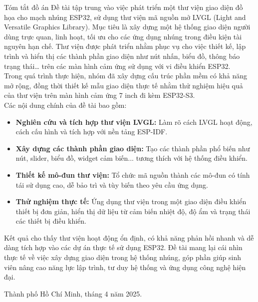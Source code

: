     \begin{preface}{Tóm tắt đồ án}
    \tab Đề tài tập trung vào việc phát triển một thư viện giao diện đồ họa cho mạch nhúng ESP32, sử dụng thư viện mã nguồn mở LVGL (Light and Versatile Graphics Library). Mục tiêu là xây dựng một hệ thống giao diện người dùng trực quan, linh hoạt, tối ưu cho các ứng dụng nhúng trong điều kiện tài nguyên hạn chế. Thư viện được phát triển nhằm phục vụ cho việc thiết kế, lập trình và hiển thị các thành phần giao diện như nút nhấn, biểu đồ, thông báo trạng thái… trên các màn hình cảm ứng sử dụng với vi điều khiển ESP32.\\
    \tab Trong quá trình thực hiện, nhóm đã xây dựng cấu trúc phần mềm có khả năng mở rộng, đồng thời thiết kế mẫu giao diện thực tế nhằm thử nghiệm hiệu quả của thư viện trên màn hình cảm ứng 7 inch đi kèm ESP32-S3.\\
    \tab Các nội dung chính của đề tài bao gồm:
    \begin{itemize}
        \item \textbf{Nghiên cứu và tích hợp thư viện LVGL:} Làm rõ cách LVGL hoạt động, cách cấu hình và tích hợp với nền tảng ESP-IDF.
        \item \textbf{Xây dựng các thành phần giao diện:} Tạo các thành phần phổ biến như nút, slider, biểu đồ, widget cảm biến... tương thích với hệ thống điều khiển.
        \item \textbf{Thiết kế mô-đun thư viện:} Tổ chức mã nguồn thành các mô-đun có tính tái sử dụng cao, dễ bảo trì và tùy biến theo yêu cầu ứng dụng.
        \item \textbf{Thử nghiệm thực tế:} Ứng dụng thư viện trong một giao diện điều khiển thiết bị đơn giản, hiển thị dữ liệu từ cảm biến nhiệt độ, độ ẩm và trạng thái các thiết bị điều khiển.
    \end{itemize}
    \tab Kết quả cho thấy thư viện hoạt động ổn định, có khả năng phản hồi nhanh và dễ dàng tích hợp vào các dự án thực tế sử dụng ESP32. Đề tài mang lại cái nhìn thực tế về việc xây dựng giao diện trong hệ thống nhúng, góp phần giúp sinh viên nâng cao năng lực lập trình, tư duy hệ thống và ứng dụng công nghệ hiện đại.
    \begin{flushright}
    Thành phố Hồ Chí Minh, tháng 4 năm 2025.
    \end{flushright}
    \end{preface}
    
